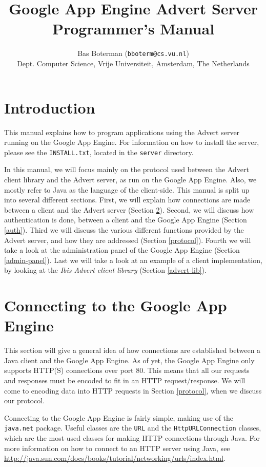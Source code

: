 \documentclass[a4paper,10pt]{article}
\title{Google App Engine Advert Server\\
       Programmer's Manual}
\author{
  Bas Boterman (\texttt{bboterm@cs.vu.nl})\\
  \small Dept. Computer Science, Vrije Universiteit, Amsterdam, The Netherlands
}
\begin{document}
\maketitle

\section{Introduction}
\label{introduction}
This manual explains how to program applications using the Advert server running
on the Google App Engine. For information on how to install the server, please
see the \texttt{INSTALL.txt}, located in the \texttt{server} directory.

In this manual, we will focus mainly on the protocol used between the Advert
client library and the Advert server, as run on the Google App Engine. Also, we
mostly refer to Java as the language of the client-side. This manual is split up into
several different sections. First, we will explain how connections are made
between a client and the Advert server (Section \ref{http-java}). Second, we
will
discuss how authentication is done, between a client and the Google App Engine
(Section \ref{auth}). Third we will discuss the various different functions
provided by the Advert server, and how they are addressed (Section
\ref{protocol}). Fourth we will take a look at the administration panel of the
Google App Engine (Section \ref{admin-panel}). Last we will take a look at an
example of a client implementation, by looking at the \emph{Ibis Advert
client library} (Section \ref{advert-lib}).

\section{Connecting to the Google App Engine}
\label{http-java}
This section will give a general idea of how connections are established
between a Java client and the Google App Engine. As of yet, the Google App
Engine only supports HTTP(S) connections over port 80. This means that all our
requests and responses must be encoded to fit in an HTTP request/response. We
will come to encoding data into HTTP requests in Section \ref{protocol}, when
we discuss our protocol.

Connecting to the Google App Engine is fairly simple, making use of the
\texttt{java.net} package. Useful classes are the \texttt{URL} and the
\texttt{HttpURLConnection} classes, which are the most-used classes for making
HTTP connections through Java. For more information on how to connect to an
HTTP server using Java, see
\url{http://java.sun.com/docs/books/tutorial/networking/urls/index.html}.
\end{document}
